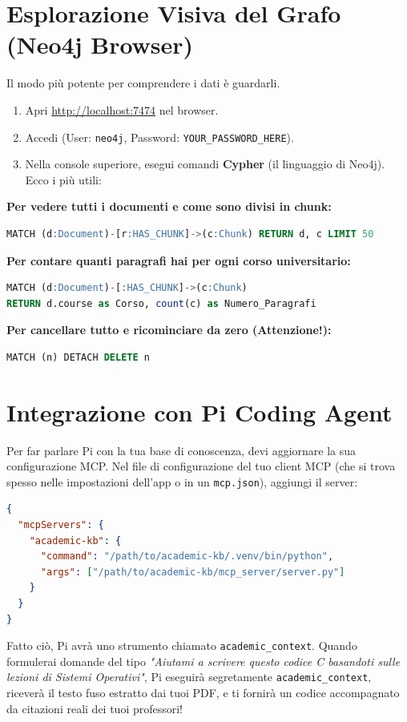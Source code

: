\documentclass[12pt,a4paper]{article}
\begin{document}
\section{Esplorazione Visiva del Grafo (Neo4j Browser)}
Il modo più potente per comprendere i dati è guardarli.
\begin{enumerate}
    \item Apri \url{http://localhost:7474} nel browser.
    \item Accedi (User: \texttt{neo4j}, Password: \texttt{YOUR\_PASSWORD\_HERE}).
    \item Nella console superiore, esegui comandi \textbf{Cypher} (il linguaggio di Neo4j). Ecco i più utili:
\end{enumerate}

\textbf{Per vedere tutti i documenti e come sono divisi in chunk:}
\begin{lstlisting}[language=SQL]
MATCH (d:Document)-[r:HAS_CHUNK]->(c:Chunk) RETURN d, c LIMIT 50
\end{lstlisting}

\textbf{Per contare quanti paragrafi hai per ogni corso universitario:}
\begin{lstlisting}[language=SQL]
MATCH (d:Document)-[:HAS_CHUNK]->(c:Chunk)
RETURN d.course as Corso, count(c) as Numero_Paragrafi
\end{lstlisting}

\textbf{Per cancellare tutto e ricominciare da zero (Attenzione!):}
\begin{lstlisting}[language=SQL]
MATCH (n) DETACH DELETE n
\end{lstlisting}

\section{Integrazione con Pi Coding Agent}
Per far parlare Pi con la tua base di conoscenza, devi aggiornare la sua configurazione MCP.
Nel file di configurazione del tuo client MCP (che si trova spesso nelle impostazioni dell'app o in un \texttt{mcp.json}), aggiungi il server:

\begin{lstlisting}[language=json]
{
  "mcpServers": {
    "academic-kb": {
      "command": "/path/to/academic-kb/.venv/bin/python",
      "args": ["/path/to/academic-kb/mcp_server/server.py"]
    }
  }
}
\end{lstlisting}

Fatto ciò, Pi avrà uno strumento chiamato \texttt{academic\_context}. Quando formulerai domande del tipo \textit{"Aiutami a scrivere questo codice C basandoti sulle lezioni di Sistemi Operativi"}, Pi eseguirà segretamente \texttt{academic\_context}, riceverà il testo fuso estratto dai tuoi PDF, e ti fornirà un codice accompagnato da citazioni reali dei tuoi professori!
\end{document}
